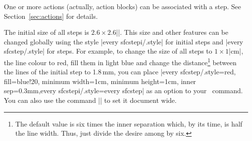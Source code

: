 \documentclass[a4paper]{ltxdoc}
\begin{document}
\begin{center}
\end{center}

One or more actions (actually, action blocks) can be associated with a step. See Section~\ref{sec:actions} for details.

The initial size of all steps is $2.6\times2.6$|\tikzcircuitssizeunit|. This size and other features can be changed globally using the style |every sfcstepi/.style| for initial steps and |every sfcstep/.style| for steps. For example, to change the size of all steps to $1\times 1$|cm|, the line colour to red, fill them in light blue and change the distance\footnote{The default value is six times the inner separation which, by its time, is half the line width. Thus, just divide the desire among by six.} between the lines of the initial step to 1.8\,mm, you can place |every sfcstep/.style={red,  fill=blue!20, minimum width=1cm, minimum height=1cm, inner sep=0.3mm},every sfcstepi/.style=every sfcstep| as an option to your \tikzname\ command. You can also use the command |\tikzset| to set it document wide.
\begin{codeexample}[]
\end{codeexample}
\end{document}
